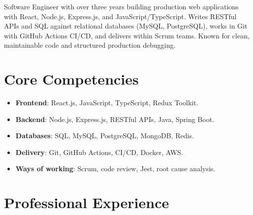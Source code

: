\documentclass[11pt,a4paper,sans]{moderncv}
\begin{document}
\makecvtitle

\vspace{6pt}
{\small Software Engineer with over three years building production web applications with React, Node.js, Express.js, and JavaScript/TypeScript. Writes RESTful APIs and SQL against relational databases (MySQL, PostgreSQL), works in Git with GitHub Actions CI/CD, and delivers within Scrum teams. Known for clean, maintainable code and structured production debugging.\par}

\section{Core Competencies}
\vspace{1pt}
\begin{itemize}

\item \textbf{Frontend}: React.js, JavaScript, TypeScript, Redux Toolkit.

\item \textbf{Backend}: Node.js, Express.js, RESTful APIs, Java, Spring Boot.

\item \textbf{Databases}: SQL, MySQL, PostgreSQL, MongoDB, Redis.

\item \textbf{Delivery}: Git, GitHub Actions, CI/CD, Docker, AWS.

\item \textbf{Ways of working}: Scrum, code review, Jest, root cause analysis.

\end{itemize}

\section{Professional Experience}
\vspace{3pt}
\end{document}
